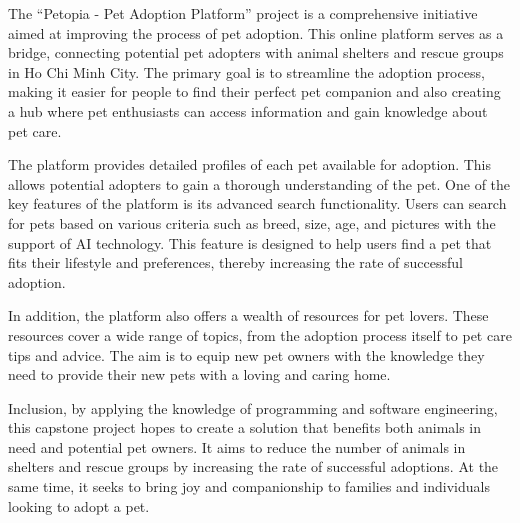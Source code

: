 The “Petopia - Pet Adoption Platform” project is a comprehensive initiative aimed at improving the process of pet adoption. This online platform serves as a bridge, connecting potential pet adopters with animal shelters and rescue groups  in Ho Chi Minh City. The primary goal is to streamline the adoption process, making it easier for people to find their perfect pet companion and also creating a hub where pet enthusiasts can access information and gain knowledge about pet care.

The platform provides detailed profiles of each pet available for adoption. This allows potential adopters to gain a thorough understanding of the pet. One of the key features of the platform is its advanced search functionality. Users can search for pets based on various criteria such as breed, size, age, and pictures with the support of AI technology. This feature is designed to help users find a pet that fits their lifestyle and preferences, thereby increasing the rate of successful adoption.

In addition, the platform also offers a wealth of resources for pet lovers. These resources cover a wide range of topics, from the adoption process itself to pet care tips and advice. The aim is to equip new pet owners with the knowledge they need to provide their new pets with a loving and caring home.

Inclusion, by applying the knowledge of programming and software engineering, this capstone project hopes to create a solution that benefits both animals in need and potential pet owners. It aims to reduce the number of animals in shelters and rescue groups by increasing the rate of successful adoptions. At the same time, it seeks to bring joy and companionship to families and individuals looking to adopt a pet.